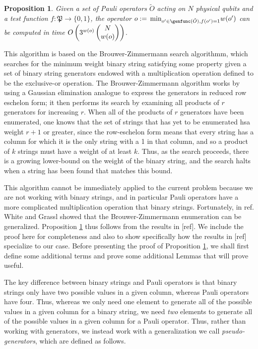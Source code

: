 \documentclass[twocolumn,showpacs,preprintnumbers,amsmath,amssymb,nofootinbib,pra,floatfix]{revtex4-1}
\newtheorem{proposition}{Proposition}
\newenvironment{remark}[1][Remark]{\begin{trivlist}
\item[\hskip \labelsep {\bfseries #1}]}{\end{trivlist}}
\newcommand{\set}{\tilde}
\newcommand{\pauligroup}{\mathfrak{P}}
\begin{document}
\begin{proposition}
\label{minimal-weight-search}
Given a set of Pauli operators $\set O$ acting on $N$ physical qubits and a test function $f:\pauligroup\to\{0,1\}$, the operator $o := \min_{o'\in \genfunc(\set O), f(o')=1} w(o')$ can be computed in time $O\left(3^{w(o)}\left(\begin{matrix}N\\w(o)\end{matrix}\right)\right)$.
\end{proposition}
\begin{remark}
This algorithm is based on the Brouwer-Zimmermann search algorithmm, which searches for the minimum weight binary string satisfying some property given a set of binary string generators endowed with a multiplication operation defined to be the exclusive-or operation.  The Brouwer-Zimmermann algorithm works by using a Gaussian elimination analogue to express the generators in reduced row eschelon form;  it then performs its search by examining all products of $r$ generators for increasing $r$.  When all of the products of $r$ generators have been enumerated, one knows that the set of strings that has yet to be enumerated hsa weight $r+1$ or greater, since the row-eschelon form means that every string has a column for which it is the only string with a 1 in that column, and so a product of $k$ strings must have a weight of at least $k$.  Thus, as the search proceeds, there is a growing lower-bound on the weight of the binary string, and the search halts when a string has been found that matches this bound.

This algorithm cannot be immediately applied to the current problem because we are not working with binary strings, and in particular Pauli operators have a more complicated multiplication operation that binary strings.  Fortunately, in ref. White and Grassl showed that the Brouwer-Zimmermann enumeration can be generalized.  Proposition \ref{minimal-weight-search} thus follows from the results in [ref].  We include the proof here for completeness and also to show specifically how the results in [ref] specialize to our case.  Before presenting the proof of Proposition \ref{minimal-weight-search}, we shall first define some additional terms and prove some additional Lemmas that will prove useful.

The key difference between binary strings and Pauli operators is that binary strings only have two possible values in a given column, whereas Pauli operators have four.  Thus, whereas we only need one element to generate all of the possible values in a given column for a binary string, we need \emph{two} elements to generate all of the possible values in a given column for a Pauli operator.  Thus, rather than working with generators, we instead work with a generalization we call \emph{pseudo-generators}, which are defined as follows.
\end{remark}
\end{document}
